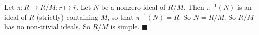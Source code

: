 Let $\pi : R \to R/M : r \mapsto \overline{r}$. Let $N$ be a nonzero ideal of $R/M$. Then $\pi^{-1}(N)$ is an ideal of $R$ (strictly) containing $M$, so that $\pi^{-1}(N)=R$. So $N= R/M$. So $R/M$ has no non-trivial ideals. So $R/M$ is simple.
 $\blacksquare$
 
 